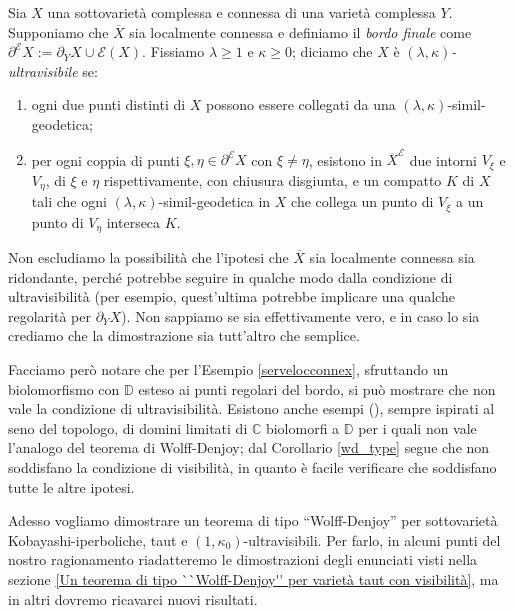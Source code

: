 \begin{defn} \label{ultravisibility}
    Sia $X$ una sottovarietà complessa e connessa di una varietà complessa $Y$. Supponiamo che $\overline{X}$ sia localmente connessa e definiamo il \textit{bordo finale} come ${\partial^\mathcal{E}X:=\partial_YX\cup\mathcal{E}(X)}$. Fissiamo $\lambda \ge 1$ e $\kappa \ge 0$; diciamo che $X$ è \textit{$(\lambda,\kappa)$-ultravisibile} se:
    \begin{enumerate}
        \item ogni due punti distinti di $X$ possono essere collegati da una $(\lambda,\kappa)$-simil-geodetica;
        \item per ogni coppia di punti $\xi,\eta\in\partial^\mathcal{E}X$ con $\xi\not=\eta$, esistono in $\overline{X}^\mathcal{E}$ due intorni $V_\xi$ e $V_\eta$, di $\xi$ e $\eta$ rispettivamente, con chiusura disgiunta, e un compatto $K$ di $X$ tali che  ogni $(\lambda,\kappa)$-simil-geodetica in $X$ che collega un punto di $V_\xi$ a un punto di $V_\eta$ interseca $K$.
    \end{enumerate}
\end{defn}

\begin{oss}
    Non escludiamo la possibilità che l'ipotesi che $\overline{X}$ sia localmente connessa sia ridondante, perché potrebbe seguire in qualche modo dalla condizione di ultravisibilità (per esempio, quest'ultima potrebbe implicare una qualche regolarità per $\partial_YX$). Non sappiamo se sia effettivamente vero, e in caso lo sia crediamo che la dimostrazione sia tutt'altro che semplice.
    
    Facciamo però notare che per l'Esempio \ref{servelocconnex}, sfruttando un biolomorfismo con $\mathbb{D}$ esteso ai punti regolari del bordo, si può mostrare che non vale la condizione di ultravisibilità. Esistono anche esempi (\cite[Example 3.3.8]{A6}), sempre ispirati al seno del topologo, di domini limitati di $\mathbb{C}$ biolomorfi a $\mathbb{D}$ per i quali non vale l'analogo del teorema di Wolff-Denjoy; dal Corollario \ref{wd_type} segue che non soddisfano la condizione di visibilità, in quanto è facile verificare che soddisfano tutte le altre ipotesi.
\end{oss}

Adesso vogliamo dimostrare un teorema di tipo ``Wolff-Denjoy'' per sottovarietà Kobayashi-iperboliche, taut e $(1,\kappa_0)$-ultravisibili. Per farlo, in alcuni punti del nostro ragionamento riadatteremo le dimostrazioni degli enunciati visti nella sezione \ref{Un teorema di tipo ``Wolff-Denjoy'' per varietà taut con visibilità}, ma in altri dovremo ricavarci nuovi risultati.


